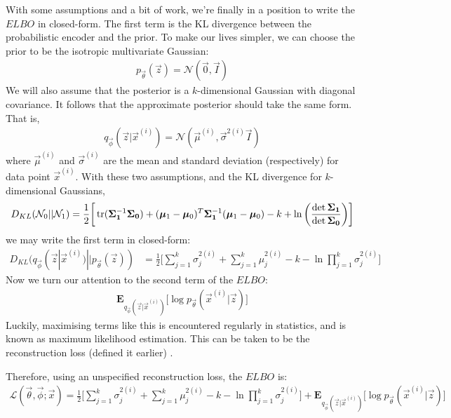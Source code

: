 With some assumptions and a bit of work, we're finally in a position to write the $ELBO$ in closed-form. The first term is the KL divergence between the probabilistic encoder and the prior. To make our lives simpler, we can choose the prior to be the isotropic multivariate Gaussian:
\begin{align}
p_{\vec{\theta}}(\vec{z}) = \mathcal{N}(\vec{0}, \vec{I})
\label{eq:variational_autoencoder_prior_standard_gaussian}
\end{align}
We will also assume that the posterior is a $k$-dimensional Gaussian with diagonal covariance. It follows that the approximate posterior should take the same form. That is,
\begin{align}
q_{\vec{\phi}}(\vec{z} | \vec{x}^{(i)}) = \mathcal{N}(\vec{\mu}^{(i)}, \vec{\sigma}^{2(i)}\vec{I})
\label{eq:approximate_posterior_gaussian}
\end{align}
where $\vec{\mu}^{(i)}$ and $\vec{\sigma}^{(i)}$ are the mean and standard deviation (respectively) for data point $\vec{x}^{(i)}$. With these two assumptions, and the KL divergence for $k$-dimensional Gaussians,
\begin{align}
D_{KL}(\mathcal{N}_0 || \mathcal{N}_1) = \frac{1}{2}\bigg[\operatorname{tr}(\bm{\Sigma_1}^{-1}\bm{\Sigma_0}) + (\bm{\mu}_1 - \bm{\mu}_0)^T\bm{\Sigma_1}^{-1}(\bm{\mu}_1-\bm{\mu}_0) - k + \ln\bigg(\frac{\det\bm{\Sigma_1}}{\det\bm{\Sigma_0}}\bigg) \bigg]
\end{align}
we may write the first term in closed-form:
\begin{align}
D_{KL}(q_{\vec{\phi}}(\vec{z}|\vec{x}^{(i)}) || p_{\vec{\theta}}(\vec{z})) &= \frac{1}{2}\bigg[ \sum_{j=1}^k \sigma^{2(i)}_j + \sum_{j=1}^k\mu^{2(i)}_j - k - \ln\prod_{j=1}^k\sigma^{2(i)}_j \bigg]
\end{align}
Now we turn our attention to the second term of the $ELBO$:
\begin{align}
\mathbf{E}_{q_{\vec{\phi}}(\vec{z}|\vec{x}^{(i)})}\big[\log p_{\vec{\theta}}(\vec{x}^{(i)} | \vec{z}) \big]
\end{align}
Luckily, maximising terms like this is encountered regularly in statistics, and is known as maximum likelihood estimation. This can be taken to be the reconstruction loss (defined it earlier) \cite{Li2016}.

Therefore, using an unspecified reconstruction loss, the $ELBO$ is:
\begin{align}
\mathcal{L}(\vec{\theta}, \vec{\phi}; \vec{x}) = \frac{1}{2}\bigg[ \sum_{j=1}^k \sigma^{2(i)}_j + \sum_{j=1}^k\mu^{2(i)}_j - k - \ln\prod_{j=1}^k\sigma^{2(i)}_j \bigg] + \mathbf{E}_{q_{\vec{\phi}}(\vec{z}|\vec{x}^{(i)})}\big[\log p_{\vec{\theta}}(\vec{x}^{(i)} | \vec{z}) \big]
\end{align}

